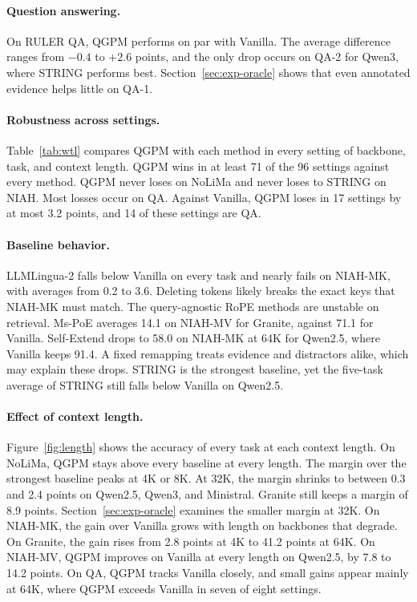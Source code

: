 \documentclass[11pt]{article}
\begin{document}
\paragraph{Question answering.}
On RULER QA, QGPM performs on par with Vanilla. The average difference ranges from $-0.4$ to $+2.6$ points, and the only drop occurs on QA-2 for Qwen3, where STRING performs best. Section~\ref{sec:exp-oracle} shows that even annotated evidence helps little on QA-1.

\paragraph{Robustness across settings.}
Table~\ref{tab:wtl} compares QGPM with each method in every setting of backbone, task, and context length. QGPM wins in at least 71 of the 96 settings against every method. QGPM never loses on NoLiMa and never loses to STRING on NIAH. Most losses occur on QA. Against Vanilla, QGPM loses in 17 settings by at most 3.2 points, and 14 of these settings are QA.

\paragraph{Baseline behavior.}
LLMLingua-2 falls below Vanilla on every task and nearly fails on NIAH-MK, with averages from 0.2 to 3.6. Deleting tokens likely breaks the exact keys that NIAH-MK must match. The query-agnostic RoPE methods are unstable on retrieval. Ms-PoE averages 14.1 on NIAH-MV for Granite, against 71.1 for Vanilla. Self-Extend drops to 58.0 on NIAH-MK at 64K for Qwen2.5, where Vanilla keeps 91.4. A fixed remapping treats evidence and distractors alike, which may explain these drops. STRING is the strongest baseline, yet the five-task average of STRING still falls below Vanilla on Qwen2.5.

\paragraph{Effect of context length.}
Figure~\ref{fig:length} shows the accuracy of every task at each context length. On NoLiMa, QGPM stays above every baseline at every length. The margin over the strongest baseline peaks at 4K or 8K. At 32K, the margin shrinks to between 0.3 and 2.4 points on Qwen2.5, Qwen3, and Ministral. Granite still keeps a margin of 8.9 points. Section~\ref{sec:exp-oracle} examines the smaller margin at 32K. On NIAH-MK, the gain over Vanilla grows with length on backbones that degrade. On Granite, the gain rises from 2.8 points at 4K to 41.2 points at 64K. On NIAH-MV, QGPM improves on Vanilla at every length on Qwen2.5, by 7.8 to 14.2 points. On QA, QGPM tracks Vanilla closely, and small gains appear mainly at 64K, where QGPM exceeds Vanilla in seven of eight settings.
\end{document}

